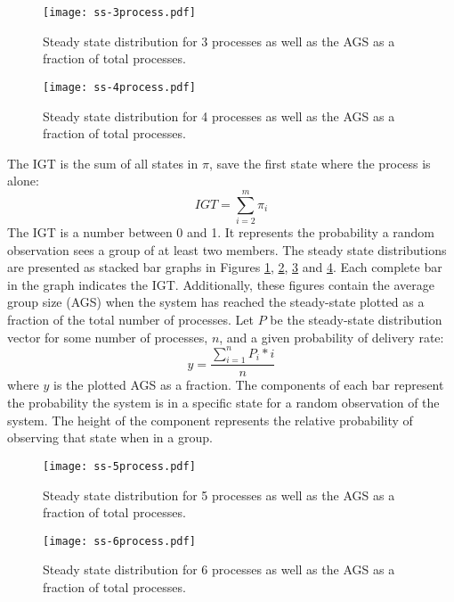 \begin{figure}
    \centering
    \texttt{[image: ss-3process.pdf]}
    \caption{Steady state distribution for 3 processes as well as the \ac{AGS} as a fraction of total processes.}
    \label{fig:ss-3process}
\end{figure}

\begin{figure}
    \centering
    \texttt{[image: ss-4process.pdf]}
    \caption{Steady state distribution for 4 processes as well as the \ac{AGS} as a fraction of total processes.}
    \label{fig:ss-4process}
\end{figure}

The \ac{IGT} is the sum of all states in $\pi$, save the first state where the process is alone:
\begin{equation} IGT = \sum_{i=2}^{m} \pi_i \end{equation}
The \ac{IGT} is a number between 0 and 1.
It represents the probability a random observation sees a group of at least two members.
The steady state distributions are presented as stacked bar graphs in Figures \ref{fig:ss-3process}, \ref{fig:ss-4process}, \ref{fig:ss-5process} and \ref{fig:ss-6process}.
Each complete bar in the graph indicates the \ac{IGT}.
Additionally, these figures contain the average group size (AGS) when the system has reached the steady-state plotted as a fraction of the total number of processes.
Let $P$ be the steady-state distribution vector for some number of processes, $n$, and a given probability of delivery rate:
\begin{equation} y = \frac{\sum_{i=1}^{n} P_{i}*i}{n} \label{eq:ss-means} \end{equation}
where $y$ is the plotted \ac{AGS} as a fraction.
The components of each bar represent the probability the system is in a specific state for a random observation of the system.
The height of the component represents the relative probability of observing that state when in a group.

\begin{figure}
    \centering
    \texttt{[image: ss-5process.pdf]}
    \caption{Steady state distribution for 5 processes as well as the \ac{AGS} as a fraction of total processes.}
    \label{fig:ss-5process}
\end{figure}

\begin{figure}
    \centering
    \texttt{[image: ss-6process.pdf]}
    \caption{Steady state distribution for 6 processes as well as the \ac{AGS} as a fraction of total processes.}
    \label{fig:ss-6process}
\end{figure}

